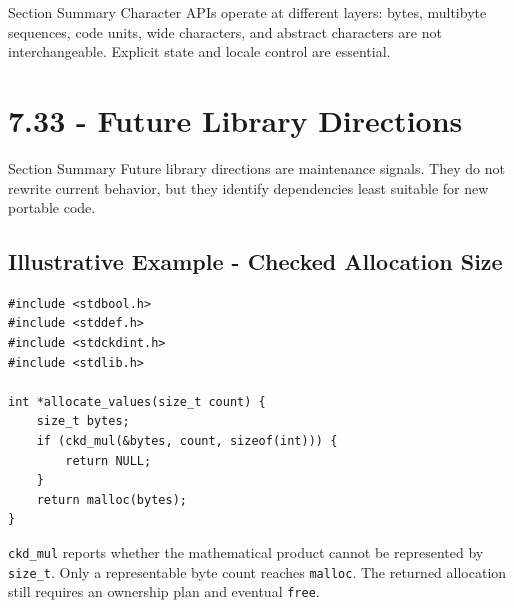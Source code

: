 \documentclass[10pt,letterpaper]{article}
\begin{document}
\begin{CornellSummaryBox}{Section Summary}
Character APIs operate at different layers: bytes, multibyte sequences, code units, wide characters, and abstract characters are not interchangeable. Explicit state and locale control are essential.
\end{CornellSummaryBox}



\section{7.33 - Future Library Directions}
\begin{CornellNotesTable}
\end{CornellNotesTable}

\begin{CornellSummaryBox}{Section Summary}
Future library directions are maintenance signals. They do not rewrite current behavior, but they identify dependencies least suitable for new portable code.
\end{CornellSummaryBox}



\subsection{Illustrative Example - Checked Allocation Size}
\begin{verbatim}
#include <stdbool.h>
#include <stddef.h>
#include <stdckdint.h>
#include <stdlib.h>

int *allocate_values(size_t count) {
    size_t bytes;
    if (ckd_mul(&bytes, count, sizeof(int))) {
        return NULL;
    }
    return malloc(bytes);
}
\end{verbatim}
\texttt{ckd\_mul} reports whether the mathematical product cannot be represented by \texttt{size\_t}. Only a representable byte count reaches \texttt{malloc}. The returned allocation still requires an ownership plan and eventual \texttt{free}.
\end{document}
